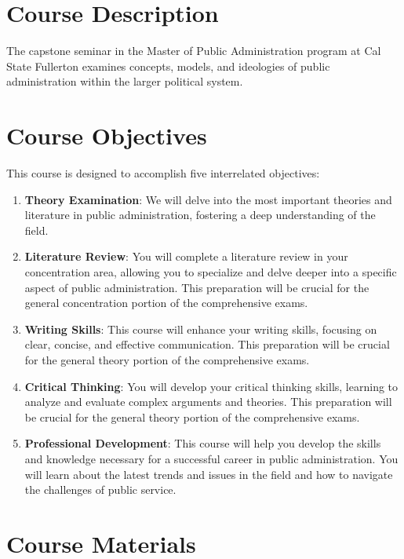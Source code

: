 \documentclass[12pt, letterpaper]{article}
\begin{document}
    \section{Course Description}
    The capstone seminar in the Master of Public Administration program at Cal State Fullerton examines concepts, models, and ideologies of public administration within the larger political system.
    
    \section{Course Objectives}
    This course is designed to accomplish five interrelated objectives:
    
    \begin{enumerate}
        \item \textbf{Theory Examination}: We will delve into the most important theories and literature in public administration, fostering a deep understanding of the field.
        \item \textbf{Literature Review}: You will complete a literature review in your concentration area, allowing you to specialize and delve deeper into a specific aspect of public administration. This preparation will be crucial for the general concentration portion of the comprehensive exams.
        \item \textbf{Writing Skills}: This course will enhance your writing skills, focusing on clear, concise, and effective communication. This preparation will be crucial for the general theory portion of the comprehensive exams.
        \item \textbf{Critical Thinking}: You will develop your critical thinking skills, learning to analyze and evaluate complex arguments and theories. This preparation will be crucial for the general theory portion of the comprehensive exams.
        \item \textbf{Professional Development}: This course will help you develop the skills and knowledge necessary for a successful career in public administration. You will learn about the latest trends and issues in the field and how to navigate the challenges of public service.
    
    \end{enumerate}
    
    \section{Course Materials}
\end{document}
